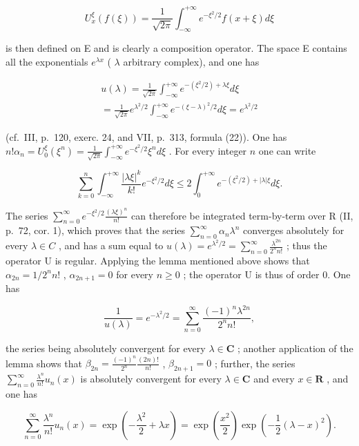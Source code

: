 \[
U _ {x} ^ {\xi} (f (\xi)) = \frac {1}{\sqrt {2 \pi}} \int_ {- \infty} ^ {+ \infty} e ^ {- \xi^ {2} / 2} f (x + \xi) d \xi
\]

is then defined on E and is clearly a composition operator. The space E contains all the exponentials \(e^{\lambda x}\) ( \(\lambda\) arbitrary complex), and one has

\[
\begin{array}{l} u (\lambda) = \frac {1}{\sqrt {2 \pi}} \int_ {- \infty} ^ {+ \infty} e ^ {- (\xi^ {2} / 2) + \lambda \xi} d \xi \\ = \frac {1}{\sqrt {2 \pi}} e ^ {\lambda^ {2} / 2} \int_ {- \infty} ^ {+ \infty} e ^ {- (\xi - \lambda) ^ {2} / 2} d \xi = e ^ {\lambda^ {2} / 2} \end{array}
\]

(cf.~III, p.~120, exerc. 24, and VII, p.~313, formula (22)). One has \(n! \alpha_n = U_0^\xi (\xi^n) = \frac{1}{\sqrt{2\pi}} \int_{-\infty}^{+\infty} e^{-\xi^2 / 2} \xi^n d\xi\) . For every integer \(n\) one can write

\[
\sum_ {k = 0} ^ {n} \int_ {- \infty} ^ {+ \infty} \frac {| \lambda \xi | ^ {k}}{k !} e ^ {- \xi^ {2} / 2} d \xi \leqslant 2 \int_ {0} ^ {+ \infty} e ^ {- (\xi^ {2} / 2) + | \lambda | \xi} d \xi .
\]

The series \(\sum_{n=0}^{\infty}e^{-\xi^{2}/2}\frac{(\lambda\xi)^{n}}{n!}\) can therefore be integrated term-by-term over R (II, p.~72, cor. 1), which proves that the series \(\sum_{n=0}^{\infty}\alpha_{n}\lambda^{n}\) converges absolutely for every \(\lambda\in C\) , and has a sum equal to \(u(\lambda)=e^{\lambda^{2}/2}=\sum_{n=0}^{\infty}\frac{\lambda^{2n}}{2^{n}n!}\) ; thus the operator U is regular. Applying the lemma mentioned above shows that \(\alpha_{2n}=1/2^{n}n!\) , \(\alpha_{2n+1}=0\) for every \(n\geqslant0\) ; the operator U is thus of order 0. One has

\[
\frac {1}{u (\lambda)} = e ^ {- \lambda^ {2} / 2} = \sum_ {n = 0} ^ {\infty} \frac {(- 1) ^ {n} \lambda^ {2 n}}{2 ^ {n} n !},
\]

the series being absolutely convergent for every \(\lambda \in \mathbf{C}\) ; another application of the lemma shows that \(\beta_{2n} = \frac{(-1)^n}{2^n}\frac{(2n)!}{n!}\) , \(\beta_{2n+1} = 0\) ; further, the series \(\sum_{n=0}^{\infty}\frac{\lambda^n}{n!} u_n(x)\) is absolutely convergent for every \(\lambda \in \mathbf{C}\) and every \(x \in \mathbf{R}\) , and one has

\[
\sum_ {n = 0} ^ {\infty} \frac {\lambda^ {n}}{n !} u _ {n} (x) = \exp \left(- \frac {\lambda^ {2}}{2} + \lambda x\right) = \exp \left(\frac {x ^ {2}}{2}\right) \exp \left(- \frac {1}{2} (\lambda - x) ^ {2}\right).
\]

